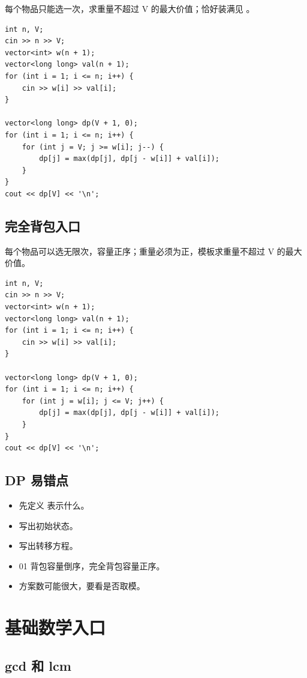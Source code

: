 每个物品只能选一次，求重量不超过 V 的最大价值；恰好装满见 。

\begin{lstlisting}
int n, V;
cin >> n >> V;
vector<int> w(n + 1);
vector<long long> val(n + 1);
for (int i = 1; i <= n; i++) {
    cin >> w[i] >> val[i];
}

vector<long long> dp(V + 1, 0);
for (int i = 1; i <= n; i++) {
    for (int j = V; j >= w[i]; j--) {
        dp[j] = max(dp[j], dp[j - w[i]] + val[i]);
    }
}
cout << dp[V] << '\n';
\end{lstlisting}

\subsection{完全背包入口}

每个物品可以选无限次，容量正序；重量必须为正，模板求重量不超过 V 的最大价值。

\begin{lstlisting}
int n, V;
cin >> n >> V;
vector<int> w(n + 1);
vector<long long> val(n + 1);
for (int i = 1; i <= n; i++) {
    cin >> w[i] >> val[i];
}

vector<long long> dp(V + 1, 0);
for (int i = 1; i <= n; i++) {
    for (int j = w[i]; j <= V; j++) {
        dp[j] = max(dp[j], dp[j - w[i]] + val[i]);
    }
}
cout << dp[V] << '\n';
\end{lstlisting}

\subsection{DP 易错点}

\begin{itemize}
  \item 先定义  表示什么。
  \item 写出初始状态。
  \item 写出转移方程。
  \item 01 背包容量倒序，完全背包容量正序。
  \item 方案数可能很大，要看是否取模。
\end{itemize}

\section{基础数学入口}\label{sec:06-25}

\subsection{gcd 和 lcm}

